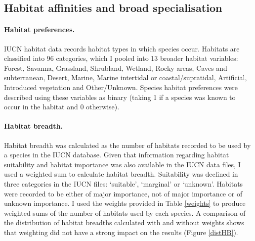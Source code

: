 \documentclass[11pt]{article}
\begin{document}
\subsection{Habitat affinities and broad specialisation}
\paragraph{Habitat preferences.}
IUCN habitat data records habitat types in which species occur. Habitats are classified into 96 categories, which I pooled into 13 broader habitat variables: 
Forest, Savanna, Grassland, Shrubland, Wetland, Rocky areas, Caves and subterranean, Desert, Marine, Marine intertidal or coastal/supratidal, Artificial, Introduced vegetation and Other/Unknown. Species habitat preferences were described using these variables as binary (taking 1 if a species was known to occur in the habitat and 0 otherwise).
\paragraph{Habitat breadth.}
Habitat breadth was calculated as the number of habitats recorded to be used by a species in the IUCN database. Given that information regarding habitat suitability and habitat importance was also available in the IUCN data files, I used a weighted sum to calculate habitat breadth. Suitability was declined in three categories in the IUCN files: `suitable', `marginal' or  `unknown'. Habitats were recorded to be either of major importance, not of major importance or of unknown importance. I used the weights provided in Table \ref{weights} to produce weighted sums of the number of habitats used by each species. A comparison of the distribution of habitat breadths calculated with and without weights shows that weighting did not have a strong impact on the results (Figure \ref{distHB}).
\end{document}
